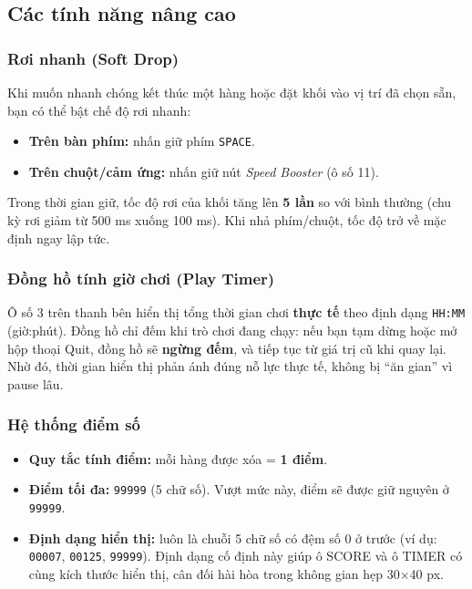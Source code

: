 \documentclass[12pt,a4paper]{article}
\begin{document}
\subsection{Các tính năng nâng cao}

\subsubsection{Rơi nhanh (Soft Drop)}
Khi muốn nhanh chóng kết thúc một hàng hoặc đặt khối vào vị trí đã chọn sẵn, bạn có thể bật chế độ rơi nhanh:
\begin{itemize}
    \item \textbf{Trên bàn phím:} nhấn giữ phím \texttt{SPACE}.
    \item \textbf{Trên chuột/cảm ứng:} nhấn giữ nút \textit{Speed Booster} (ô số 11).
\end{itemize}
Trong thời gian giữ, tốc độ rơi của khối tăng lên \textbf{5 lần} so với bình thường (chu kỳ rơi giảm từ 500 ms xuống 100 ms). Khi nhả phím/chuột, tốc độ trở về mặc định ngay lập tức.

\subsubsection{Đồng hồ tính giờ chơi (Play Timer)}
Ô số 3 trên thanh bên hiển thị tổng thời gian chơi \textbf{thực tế} theo định dạng \texttt{HH:MM} (giờ:phút). Đồng hồ chỉ đếm khi trò chơi đang chạy: nếu bạn tạm dừng hoặc mở hộp thoại Quit, đồng hồ sẽ \textbf{ngừng đếm}, và tiếp tục từ giá trị cũ khi quay lại. Nhờ đó, thời gian hiển thị phản ánh đúng nỗ lực thực tế, không bị ``ăn gian'' vì pause lâu.

\subsubsection{Hệ thống điểm số}
\begin{itemize}
    \item \textbf{Quy tắc tính điểm:} mỗi hàng được xóa = \textbf{1 điểm}.
    \item \textbf{Điểm tối đa:} \texttt{99999} (5 chữ số). Vượt mức này, điểm sẽ được giữ nguyên ở \texttt{99999}.
    \item \textbf{Định dạng hiển thị:} luôn là chuỗi 5 chữ số có đệm số 0 ở trước (ví dụ: \texttt{00007}, \texttt{00125}, \texttt{99999}). Định dạng cố định này giúp ô SCORE và ô TIMER có cùng kích thước hiển thị, cân đối hài hòa trong không gian hẹp 30$\times$40 px.
\end{itemize}
\end{document}
